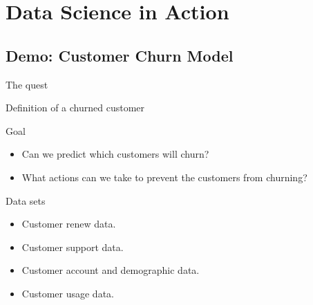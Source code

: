 \documentclass[10pt]{beamer}
\begin{document}


\section{Data Science in Action}

    \subsection{Demo: Customer Churn Model}

      \begin{frame}{The quest}
        \begin{block}{Definition of a churned customer}
        \end{block}
        \pause
        \begin{block}{Goal}
            \begin{itemize}
              \item Can we predict which customers will churn?
              \item What actions can we take to prevent the customers from churning?
            \end{itemize}
        \end{block}
        \pause
        \begin{block}{Data sets}
          \begin{itemize}
            \item Customer renew data.
            \item Customer support data.
            \item Customer account and demographic data.
            \item Customer usage data.
          \end{itemize}
        \end{block}
      \end{frame}
\end{document}
